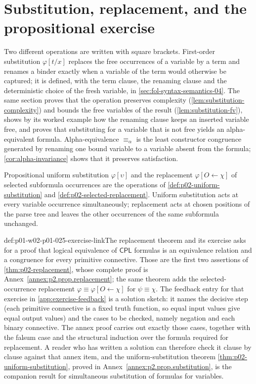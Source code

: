 \section{Substitution, replacement, and the propositional exercise}
\label{sec:p01-w02-p01-025-substitution}

Two different operations are written with square brackets.  First-order
substitution \(\varphi[t/x]\) replaces the free occurrences of a variable by
a term and renames a binder exactly when a variable of the term would
otherwise be captured; it is defined, with the term clause, the renaming
clause and the deterministic choice of the fresh variable, in
\cref{sec:fol-syntax-semantics-04}.  The same section proves that the
operation preserves complexity (\cref{lem:substitution-complexity}) and
bounds the free variables of the result (\cref{lem:substitution-fv}), shows
by its worked example how the renaming clause keeps an inserted variable
free, and proves that substituting for a variable that is not free yields an
alpha-equivalent formula.  Alpha-equivalence \(\equiv_\alpha\) is the least
constructor congruence generated by renaming one bound variable to a variable
absent from the formula; \cref{cor:alpha-invariance} shows that it preserves
satisfaction.

Propositional uniform substitution \(\varphi[\upsilon]\) and the replacement
\(\varphi[O\leftarrow\chi]\) of selected subformula occurrences are the
operations of \cref{def:p02-uniform-substitution} and
\cref{def:p02-selected-replacement}.  Uniform substitution acts at every
variable occurrence simultaneously; replacement acts at chosen positions of
the parse tree and leaves the other occurrences of the same subformula
unchanged.

\begin{hbconvention}{def:p01-w02-p01-025-exercise-link}{The replacement theorem and its exercise}
 asks for a proof that logical equivalence of
\(\mathsf{CPL}\) formulas is an equivalence relation and a congruence for
every primitive connective.  Those are the first two assertions of
\cref{thm:p02-replacement}, whose complete proof is
Annex~\ref{annex:p2.prop.replacement}; the same theorem adds the
selected-occurrence replacement \(\varphi\equiv\varphi[O\leftarrow\chi]\)
for \(\psi\equiv\chi\).  The feedback entry for that exercise in
\cref{app:exercise-feedback} is a solution sketch: it names the decisive
step (each primitive connective is a fixed truth function, so equal input
values give equal output values) and the cases to be checked, namely
negation and each binary connective.  The annex proof carries out exactly
those cases, together with the falsum case and the structural induction
over the formula required for replacement.  A reader who has written a solution can
therefore check it clause by clause against that annex item, and the
uniform-substitution theorem \cref{thm:p02-uniform-substitution}, proved in
Annex~\ref{annex:p2.prop.substitution}, is the companion result for
simultaneous substitution of formulas for variables.
\end{hbconvention}

